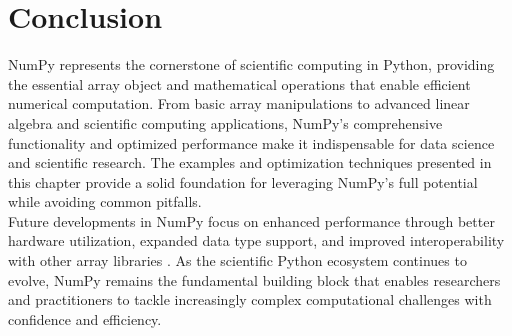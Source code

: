 \section{Conclusion}
\label{sec:conclusion}

NumPy represents the cornerstone of scientific computing in Python, providing the essential array object and mathematical operations that enable efficient numerical computation. From basic array manipulations to advanced linear algebra and scientific computing applications, NumPy's comprehensive functionality and optimized performance make it indispensable for data science and scientific research. The examples and optimization techniques presented in this chapter provide a solid foundation for leveraging NumPy's full potential while avoiding common pitfalls.\\

Future developments in NumPy focus on enhanced performance through better hardware utilization, expanded data type support, and improved interoperability with other array libraries \cite{Harris:2020}. As the scientific Python ecosystem continues to evolve, NumPy remains the fundamental building block that enables researchers and practitioners to tackle increasingly complex computational challenges with confidence and efficiency.
